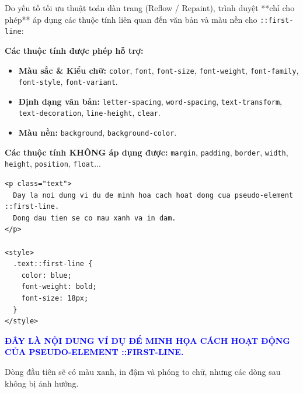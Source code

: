 \documentclass[11pt,oneside]{book}
\newcommand{\codeinline}[1]{\textcolor{accentOrange}{\texttt{#1}}}
\begin{document}
\begin{warnBox}
Do yếu tố tối ưu thuật toán dàn trang (Reflow / Repaint), trình duyệt **chỉ cho phép** áp dụng các thuộc tính liên quan đến văn bản và màu nền cho \codeinline{::first-line}:
\par\vspace{4pt}
\textbf{Các thuộc tính được phép hỗ trợ:}
\begin{itemize}[leftmargin=1.5em, itemsep=2pt, parsep=0pt]
    \item \textbf{Màu sắc \& Kiểu chữ:} \codeinline{color}, \codeinline{font}, \codeinline{font-size}, \codeinline{font-weight}, \codeinline{font-family}, \codeinline{font-style}, \codeinline{font-variant}.
    \item \textbf{Định dạng văn bản:} \codeinline{letter-spacing}, \codeinline{word-spacing}, \codeinline{text-transform}, \codeinline{text-decoration}, \codeinline{line-height}, \codeinline{clear}.
    \item \textbf{Màu nền:} \codeinline{background}, \codeinline{background-color}.
\end{itemize}
\par\vspace{4pt}
\textbf{Các thuộc tính KHÔNG áp dụng được:} \codeinline{margin}, \codeinline{padding}, \codeinline{border}, \codeinline{width}, \codeinline{height}, \codeinline{position}, \codeinline{float}...
\end{warnBox}

\begin{codeWindow}
\begin{lstlisting}[language=HTML5]
<p class="text">
  Day la noi dung vi du de minh hoa cach hoat dong cua pseudo-element ::first-line.
  Dong dau tien se co mau xanh va in dam.
</p>

<style>
  .text::first-line {
    color: blue;
    font-weight: bold;
    font-size: 18px;
  }
</style>
\end{lstlisting}
\end{codeWindow}

\begin{browserWindow}
\sffamily\small
\textbf{\textcolor{blue}{\Large ĐÂY LÀ NỘI DUNG VÍ DỤ ĐỂ MINH HỌA CÁCH HOẠT ĐỘNG CỦA PSEUDO-ELEMENT ::FIRST-LINE.}} \par\vspace{2pt}
Dòng đầu tiên sẽ có màu xanh, in đậm và phóng to chữ, nhưng các dòng sau không bị ảnh hưởng.
\end{browserWindow}
\end{document}
